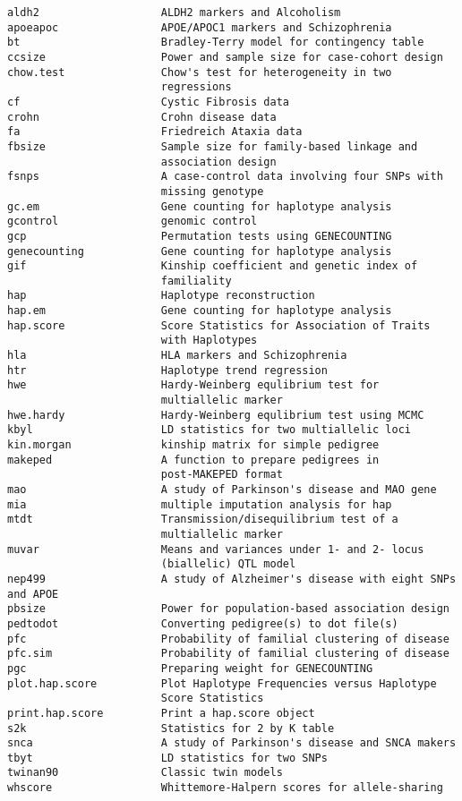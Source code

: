 \documentclass[11pt,a4paper]{article}
\begin{document}
\begin{verbatim}
aldh2                   ALDH2 markers and Alcoholism
apoeapoc                APOE/APOC1 markers and Schizophrenia
bt                      Bradley-Terry model for contingency table
ccsize                  Power and sample size for case-cohort design
chow.test               Chow's test for heterogeneity in two
                        regressions
cf                      Cystic Fibrosis data
crohn                   Crohn disease data
fa                      Friedreich Ataxia data
fbsize                  Sample size for family-based linkage and
                        association design
fsnps                   A case-control data involving four SNPs with
                        missing genotype
gc.em                   Gene counting for haplotype analysis
gcontrol                genomic control
gcp                     Permutation tests using GENECOUNTING
genecounting            Gene counting for haplotype analysis
gif                     Kinship coefficient and genetic index of
                        familiality
hap                     Haplotype reconstruction
hap.em                  Gene counting for haplotype analysis
hap.score               Score Statistics for Association of Traits
                        with Haplotypes
hla                     HLA markers and Schizophrenia
htr                     Haplotype trend regression
hwe                     Hardy-Weinberg equlibrium test for
                        multiallelic marker
hwe.hardy               Hardy-Weinberg equlibrium test using MCMC
kbyl                    LD statistics for two multiallelic loci
kin.morgan              kinship matrix for simple pedigree
makeped                 A function to prepare pedigrees in
                        post-MAKEPED format
mao                     A study of Parkinson's disease and MAO gene
mia                     multiple imputation analysis for hap
mtdt                    Transmission/disequilibrium test of a
                        multiallelic marker
muvar                   Means and variances under 1- and 2- locus
                        (biallelic) QTL model
nep499                  A study of Alzheimer's disease with eight SNPs and APOE
pbsize                  Power for population-based association design
pedtodot                Converting pedigree(s) to dot file(s)
pfc                     Probability of familial clustering of disease
pfc.sim                 Probability of familial clustering of disease
pgc                     Preparing weight for GENECOUNTING
plot.hap.score          Plot Haplotype Frequencies versus Haplotype
                        Score Statistics
print.hap.score         Print a hap.score object
s2k                     Statistics for 2 by K table
snca                    A study of Parkinson's disease and SNCA makers
tbyt                    LD statistics for two SNPs
twinan90                Classic twin models
whscore                 Whittemore-Halpern scores for allele-sharing
\end{verbatim}
\end{document}
